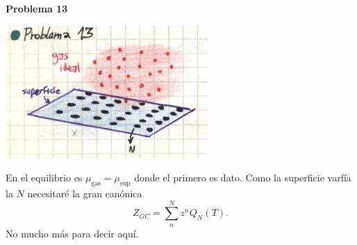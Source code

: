 \documentclass[10pt,oneside]{CBFT_book}
\begin{document}
\begin{ejemplo}{\bf Problema 13}

\includegraphics[scale=0.5]{images/1606329501.jpg}

En el equilibrio es $ \mu_\text{gas} = \mu_\text{sup} $ donde el primero es dato.
Como la superficie varfía la $N$ necesitaré la gran canónica
\[
	Z_{GC} = \sum_n^N z^n Q_N(T).
\]
No mucho más para decir aquí.
 
\end{ejemplo}



\end{document}
